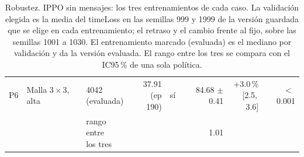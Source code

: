 \begin{table}[H]
\begin{tabular}{lllrlrrr}
P6 & \makecell[l]{Malla $3 \times 3$,\\{}alta} & \makecell[l]{4042\\{}(evaluada)} & \makecell[r]{37.91\\{}(ep 190)} & sí & \makecell[r]{84.68\\{}$\pm$ 0.41} & \makecell[r]{+3.0\,\%\\{}[2.5,\,3.6]} & $<$\,0.001 \\
 & & \makecell[l]{rango entre\\{}los tres} & & & 1.01 & & \\
\bottomrule
\end{tabular}
\caption[Robustez: entrenamientos de IPPO sin mensajes]{Robustez. IPPO sin mensajes: los tres entrenamientos de cada caso. La validación elegida es la media del timeLoss en las semillas 999 y 1999 de la versión guardada que se elige en cada entrenamiento; el retraso y el cambio frente al fijo, sobre las semillas 1001 a 1030. El entrenamiento marcado (evaluada) es el mediano por validación y da la versión evaluada. El rango entre los tres se compara con el IC95\,\% de una sola política.}
\label{tab:robustez-veredicto-bases-ippo-local}
\end{table}

